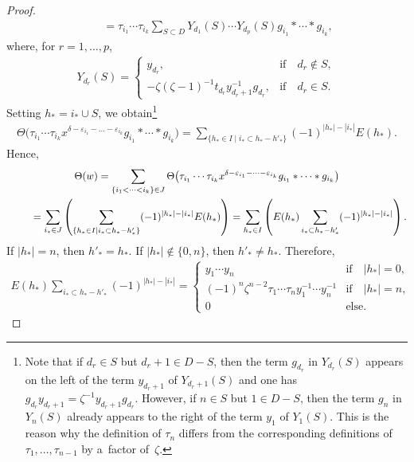 \begin{proof}
\begin{gather*}
\qquad
= \tau_{i_1}\cdots \tau_{i_k} \sum\limits_{S\subset D} Y_{d_1}(S) \cdots Y_{d_p}(S) g_{i_1}*\cdots * g_{i_k},
\end{gather*}
where, for $r=1,\ldots, p$,
\begin{gather*}
Y_{d_r}(S) =
\begin{cases}
y_{d_r}, & \text{if} \quad d_r\notin S,
\\
- \zeta(\zeta-1)^{-1} t_{d_r}y_{d_r+1}^{-1}g_{d_r}, & \text{if} \quad d_r\in S.
\end{cases}
\end{gather*}
Setting $h_* = i_* \cup S$, we obtain\footnote{Note that if $d_r\in S$ but $d_r+1\in D-S$, then the term $g_{d_r}$ in
$Y_{d_r}(S)$ appears on the left of the term $y_{d_r+1}$ of $Y_{d_r+1}(S)$ and one has $g_{d_r} y_{d_r+1} = \zeta^{-1}
y_{d_r+1} g_{d_r}$.
However, if $n\in S$ but $1\in D-S$, then the term $g_n$ in $Y_n(S)$ already appears to the right of the term $y_1$ of
$Y_1(S)$.
This is the reason why the def\/inition of $\tau_n$ dif\/fers from the corresponding def\/initions of $\tau_1,\ldots,
\tau_{n-1}$ by a~factor of~$\zeta$.}
\begin{gather*}
\Theta\big(\tau_{i_1}\cdots \tau_{i_k} x^{\delta-\varepsilon_{i_1} - \dots - \varepsilon_{i_k}} g_{i_1}*\cdots * g_{i_k}\big) =
\sum\limits_{\{h_*\in I \mid i_*\subset h_*- h'_* \}} (-1)^{|h_*|-|i_*|} E(h_*).
\end{gather*}
Hence,
\begin{gather*}
\Theta(w) = \sum\limits_{\{i_1<\dots<i_k\}\in J} \Theta\big(\tau_{i_1}\cdots \tau_{i_k} x^{\delta-\varepsilon_{i_1} - \dots -
\varepsilon_{i_k}} g_{i_1}*\dots * g_{i_k}\big)
\\
\hphantom{\Theta(w)}{}
{} = \sum\limits_{i_*\in J} \left(\sum\limits_{\{h_*\in I \mid i_*\subset h_*- h'_*\}} (-1)^{|h_*|-|i_*|} E(h_*) \right)
 = \sum\limits_{h_*\in I} \left (E(h_*) \sum\limits_{i_*\subset h_*-h'_*} (-1)^{|h_*|-|i_*|} \right).
\end{gather*}
If $|h_*|=n$, then $h'_*= h_*$.
If $|h_*|\notin\{0,n\}$, then $h'_* \neq h_*$.
Therefore,
\begin{gather*}
E(h_*) \sum\limits_{i_*\subset h_*-h'_*} (-1)^{|h_*|-|i_*|} =
\begin{cases}
y_1\cdots y_n & \text{if} \quad |h_*|=0,
\\
(-1)^n \zeta^{n-2} \tau_1\cdots \tau_n y_1^{-1} \cdots y_n^{-1} & \text{if} \quad |h_*|=n,
\\
0 & \text{else.}
\end{cases}
\tag*{\qed}
\end{gather*}
\renewcommand{\qed}{}
\end{proof}

